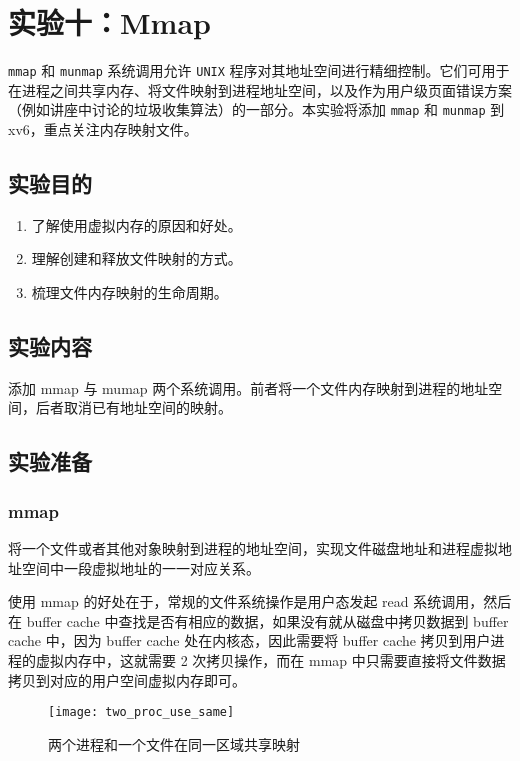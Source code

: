 \section{实验十：Mmap}\label{sec:Mmap}

\texttt{mmap} 和 \texttt{munmap} 系统调用允许 \texttt{UNIX} 程序对其地址空间进行精细控制。它们可用于在进程之间共享内存、将文件映射到进程地址空间，以及作为用户级页面错误方案（例如讲座中讨论的垃圾收集算法）的一部分。本实验将添加 \texttt{mmap} 和 \texttt{munmap} 到 xv6，重点关注内存映射文件。

\subsection{实验目的}

\begin{enumerate}
	\item 了解使用虚拟内存的原因和好处。 
    \item 理解创建和释放文件映射的方式。 
	\item 梳理文件内存映射的生命周期。 
\end{enumerate}

\subsection{实验内容}

添加 mmap 与 mumap 两个系统调用。前者将一个文件内存映射到进程的地址空间，后者取消已有地址空间的映射。

\subsection{实验准备}

\subsubsection{mmap}

将一个文件或者其他对象映射到进程的地址空间，实现文件磁盘地址和进程虚拟地址空间中一段虚拟地址的一一对应关系。

使用 mmap 的好处在于，常规的文件系统操作是用户态发起 read 系统调用，然后在 buffer cache 中查找是否有相应的数据，如果没有就从磁盘中拷贝数据到 buffer cache 中，因为 buffer cache 处在内核态，因此需要将 buffer cache 拷贝到用户进程的虚拟内存中，这就需要 2 次拷贝操作，而在 mmap 中只需要直接将文件数据拷贝到对应的用户空间虚拟内存即可。

\begin{figure}[!htb]
	\centering
	\texttt{[image: two\_proc\_use\_same]}
	\caption{两个进程和一个文件在同一区域共享映射}
	\label{fig:two_proc_use_same}
\end{figure}


